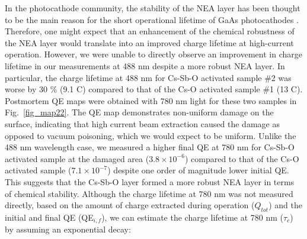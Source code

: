 In the photocathode community, the stability of the NEA layer has been thought to be the main reason for the short operational lifetime of GaAs photocathodes \cite{liu2016_EffectsIonBombardmenta,biswas2019_StudyPhotocathodeSurfacea}.
Therefore, one might expect that an enhancement of the chemical robustness of the NEA layer would translate into an improved charge lifetime at high-current operation.
However, we were unable to directly observe an improvement in charge lifetime in our measurements at 488 nm despite a more robust NEA layer.
In particular, the charge lifetime at 488 nm for Cs-Sb-O activated sample \#2 was worse by 30 \% (9.1 C) compared to that of the Cs-O activated sample \#1 (13 C). Postmortem QE maps were obtained with 780 nm light for these two samples in Fig.~\ref{fig_map22}.
The QE map demonstrates non-uniform damage on the surface, indicating that high current beam extraction caused the damage as opposed to vacuum poisoning, which we would expect to be uniform.
Unlike the 488 nm wavelength case, we measured a higher final QE at 780 nm for Cs-Sb-O activated sample at the damaged area ($3.8 \times 10^{-6}$) compared to that of the Cs-O activated sample ($7.1 \times 10^{-7}$) despite one order of magnitude lower initial QE. This suggests that the Cs-Sb-O layer formed a more robust NEA layer in terms of chemical stability.
Although the charge lifetime at 780 nm was not measured directly, based on the amount of charge extracted during operation ($Q_{tot}$) and the initial and final QE (QE$_{i,f}$), we can estimate the charge lifetime at 780 nm ($\tau_{c}$) by assuming an exponential decay:
